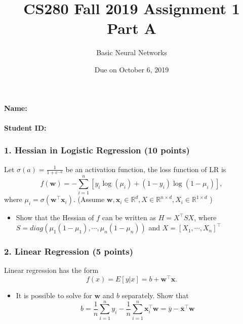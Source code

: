 \documentclass[12pt]{article}%
\begin{document}
\title{CS280 Fall 2019 Assignment 1 \\ Part A}
\author{Basic Neural Networks}
\date{Due on October 6, 2019}
\maketitle

\paragraph{Name:}

\paragraph{Student ID:}

\newpage


\subsubsection*{1. Hessian in Logistic Regression (10 points)}
Let $\sigma(a)=\frac{1}{1+e^{-a}}$ be an activation function, the loss function of LR is  \[f(\mathbf{w})=-\sum_{i=1}^{n}[y_i\log(\mu_i)+(1-y_i)\log(1-\mu_i)],\] where $\mu_i=\sigma(\mathbf{w}^\intercal\mathbf{x}_i)$. (Assume $\textbf{w},\textbf{x}_i\in\mathbb{R}^d, X\in\mathbb{R}^{n\times d}, X_i\in\mathbb{R}^{1\times d}$
)
\begin{itemize}
	\item Show that the Hessian of $f$ can be written as $H=X^\intercal S X$, where $S=diag(\mu_1(1-\mu_1),\cdots, \mu_n(1-\mu_n))$ and $X = [X_1,\cdots, X_n]^\intercal$
\end{itemize}


\newpage


\subsubsection*{2. Linear Regression (5 points)}
Linear regression has the form \[f(x)=E[y|x] = b + \mathbf{w}^\intercal \mathbf{x}.\]  
\begin{itemize}
	\item It is possible to solve for $\mathbf{w}$ and $b$ separately. Show that 
	\[b = \frac{1}{n}\sum_{i=1}^n y_i -\frac{1}{n}\sum_{i=1}^n \mathbf{x}_i^\intercal \mathbf{w} = \bar{y} - \bar{\mathbf{x}}^\intercal \mathbf{w}\]
\end{itemize}
\end{document}
